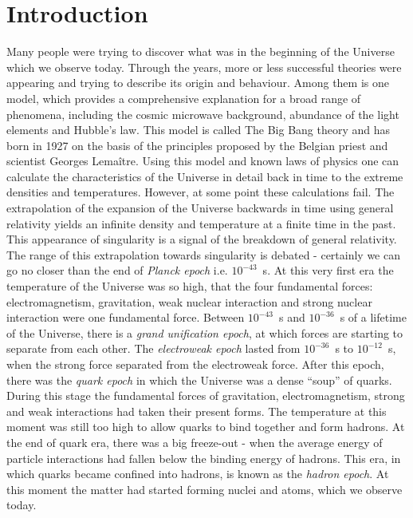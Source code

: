 \chapter*{Introduction}
Many people were trying to discover what was in the beginning of the Universe which we observe today.
Through the years, more or less successful theories were appearing and trying to describe its origin and behaviour.
Among them is one model, which provides a comprehensive explanation for a broad range of phenomena, including the cosmic microwave background, abundance of the light elements and Hubble's law.
This model is called The Big Bang theory and has born in 1927 on the basis of the principles proposed by the Belgian priest and scientist Georges Lema{\^i}tre.
Using this model and known laws of physics one can calculate the characteristics of the Universe in detail back in time to the extreme densities and temperatures.
However, at some point these calculations fail.
The extrapolation of the expansion of the Universe backwards in time using general relativity yields an infinite density and temperature at a finite time in the past.
This appearance of singularity is a signal of the breakdown of general relativity.
The range of this extrapolation towards singularity is debated - certainly we can go no closer than the end of \textit{Planck epoch} i.e. $10^{-43}$~s.
At this very first era the temperature of the Universe was so high, that the four fundamental forces: electromagnetism, gravitation, weak nuclear interaction and strong nuclear interaction were one fundamental force.
Between $10^{-43}$~s and $10^{-36}$~s of a lifetime of the Universe, there is a \textit{grand unification epoch}, at which forces are starting to separate from each other.
The \textit{electroweak epoch} lasted from $10^{-36}$~s to $10^{-12}$~s, when the strong force separated from the electroweak force.
After this epoch, there was the \textit{quark epoch} in which the Universe was a dense ``soup'' of quarks.
During this stage the fundamental forces of gravitation, electromagnetism, strong and weak interactions had taken their present forms. 
The temperature at this moment was still too high to allow quarks to bind together and form hadrons.
At the end of quark era, there was a big freeze-out - when the average energy of particle interactions had fallen below the binding energy of hadrons.
This era, in which quarks became confined into hadrons, is known as the \textit{hadron epoch}.
At this moment the matter had started forming nuclei and atoms, which we observe today.

